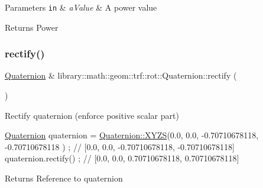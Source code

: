 \begin{DoxyParams}[1]{Parameters}
\mbox{\tt in}  & {\em a\+Value} & A power value \\
\hline
\end{DoxyParams}
\begin{DoxyReturn}{Returns}
Power 
\end{DoxyReturn}
\mbox{\label{classlibrary_1_1math_1_1geom_1_1trf_1_1rot_1_1_quaternion_a41cbb9a19380bd08110455190a0a9770}} 
\subsubsection{\texorpdfstring{rectify()}{rectify()}}
{\footnotesize\ttfamily \hyperlink{classlibrary_1_1math_1_1geom_1_1trf_1_1rot_1_1_quaternion}{Quaternion} \& library\+::math\+::geom\+::trf\+::rot\+::\+Quaternion\+::rectify (\begin{DoxyParamCaption}{ }\end{DoxyParamCaption})}



Rectify quaternion (enforce positive scalar part) 


\begin{DoxyCode}
\hyperlink{classlibrary_1_1math_1_1geom_1_1trf_1_1rot_1_1_quaternion_aa7f459a08f5af38b9f7676a6bf36a21c}{Quaternion} quaternion = \hyperlink{classlibrary_1_1math_1_1geom_1_1trf_1_1rot_1_1_quaternion_afff9523c7dcbfbbc521736121e62ad41}{Quaternion::XYZS}(0.0, 0.0, -0.70710678118, -0.70710678118
      ) ; \textcolor{comment}{// [0.0, 0.0, -0.70710678118, -0.70710678118]}
quaternion.rectify() ; \textcolor{comment}{// [0.0, 0.0, 0.70710678118, 0.70710678118]}
\end{DoxyCode}


\begin{DoxyReturn}{Returns}
Reference to quaternion 
\end{DoxyReturn}
\mbox{\label{classlibrary_1_1math_1_1geom_1_1trf_1_1rot_1_1_quaternion_a7e8dbb362e5fe18217724259fde80a03}} 
